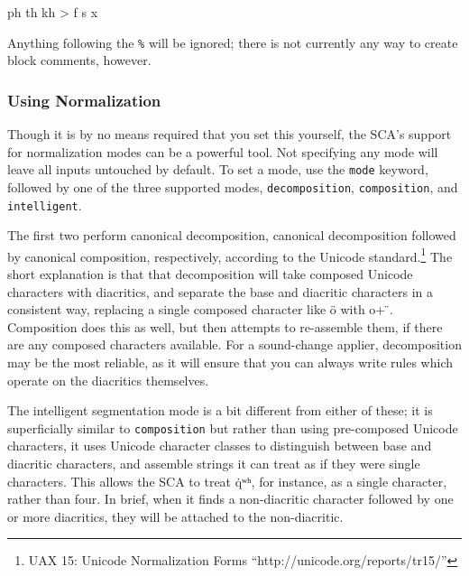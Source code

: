 \documentclass[10pt,letterpaper]{article}
\newcommand\textIPA[1]{{\fontIPA #1}}
\newcounter{excounter}
\newenvironment{vex}[1]{
  \vspace{1em}
  \refstepcounter{excounter}
  \noindent\makebox[3em][l]{(\arabic{excounter}\label{#1})}
  \minipage{\textwidth}
  \verbatim
}{
  \endverbatim
  \endminipage
  \vspace{1em}
}
\begin{document}
\begin{vex}{ex:comment}
ph th kh > f s x %
\end{vex}

\noindent
Anything following the \texttt{\%} will be ignored; there is not currently any way to create block comments, however. 


\subsubsection{Using Normalization} 
\label{ssub:using_normalization}
Though it is by no means required that you set this yourself, the SCA's support for normalization modes can be a powerful tool. Not specifying any mode will leave all inputs untouched by default. To set a mode, use the \texttt{mode} keyword, followed by one of the three supported modes, \texttt{decomposition}, \texttt{composition}, and \texttt{intelligent}.

The first two perform canonical decomposition, canonical decomposition followed by canonical composition, respectively, according to the Unicode standard.\footnote{UAX 15: Unicode Normalization Forms ``http://unicode.org/reports/tr15/''} The short explanation is that that decomposition will take composed Unicode characters with diacritics, and separate the base and diacritic characters in a consistent way, replacing a single composed character like ö with o+ ̈. Composition does this as well, but then attempts to re-assemble them, if there are any composed characters available. For a sound-change applier, decomposition may be the most reliable, as it will ensure that you can always write rules which operate on the diacritics themselves.


The intelligent segmentation mode is a bit different from either of these; it is superficially similar to \texttt{composition} but rather than using pre-composed Unicode characters, it uses Unicode character classes to distinguish between base and diacritic characters, and assemble strings it can treat as if they were single characters. This allows the SCA to treat \textIPA{q̇ʷʰ}, for instance, as a single character, rather than four. In brief, when it finds a non-diacritic character followed by one or more diacritics, they will be attached to the non-diacritic.
\end{document}
